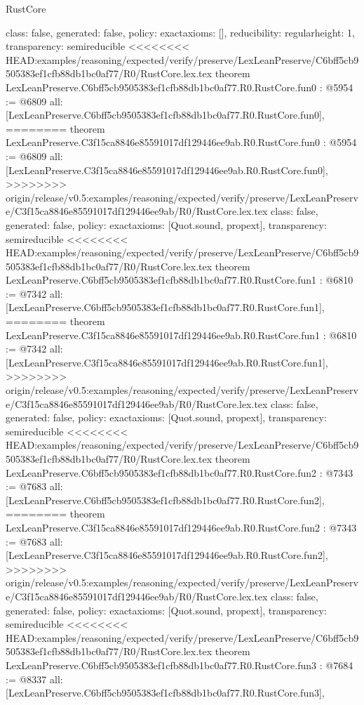 \begin{lexlean}{RustCore}
\begin{coremodule}
{\begin{coremodule}
{{{  class: false,
  generated: false,
  policy: exact{axioms: []},
  reducibility: regular{height: 1},
  transparency: semireducible
}
<<<<<<<< HEAD:examples/reasoning/expected/verify/preserve/LexLeanPreserve/C6bff5cb9505383ef1cfb88db1bc0af77/R0/RustCore.lex.tex
theorem LexLeanPreserve.C6bff5cb9505383ef1cfb88db1bc0af77.R0.RustCore.fun0 : @5954 := @6809 {
  all: [LexLeanPreserve.C6bff5cb9505383ef1cfb88db1bc0af77.R0.RustCore.fun0],
========
theorem LexLeanPreserve.C3f15ca8846e85591017df129446ee9ab.R0.RustCore.fun0 : @5954 := @6809 {
  all: [LexLeanPreserve.C3f15ca8846e85591017df129446ee9ab.R0.RustCore.fun0],
>>>>>>>> origin/release/v0.5:examples/reasoning/expected/verify/preserve/LexLeanPreserve/C3f15ca8846e85591017df129446ee9ab/R0/RustCore.lex.tex
  class: false,
  generated: false,
  policy: exact{axioms: [Quot.sound, propext]},
  transparency: semireducible
}
<<<<<<<< HEAD:examples/reasoning/expected/verify/preserve/LexLeanPreserve/C6bff5cb9505383ef1cfb88db1bc0af77/R0/RustCore.lex.tex
theorem LexLeanPreserve.C6bff5cb9505383ef1cfb88db1bc0af77.R0.RustCore.fun1 : @6810 := @7342 {
  all: [LexLeanPreserve.C6bff5cb9505383ef1cfb88db1bc0af77.R0.RustCore.fun1],
========
theorem LexLeanPreserve.C3f15ca8846e85591017df129446ee9ab.R0.RustCore.fun1 : @6810 := @7342 {
  all: [LexLeanPreserve.C3f15ca8846e85591017df129446ee9ab.R0.RustCore.fun1],
>>>>>>>> origin/release/v0.5:examples/reasoning/expected/verify/preserve/LexLeanPreserve/C3f15ca8846e85591017df129446ee9ab/R0/RustCore.lex.tex
  class: false,
  generated: false,
  policy: exact{axioms: [Quot.sound, propext]},
  transparency: semireducible
}
<<<<<<<< HEAD:examples/reasoning/expected/verify/preserve/LexLeanPreserve/C6bff5cb9505383ef1cfb88db1bc0af77/R0/RustCore.lex.tex
theorem LexLeanPreserve.C6bff5cb9505383ef1cfb88db1bc0af77.R0.RustCore.fun2 : @7343 := @7683 {
  all: [LexLeanPreserve.C6bff5cb9505383ef1cfb88db1bc0af77.R0.RustCore.fun2],
========
theorem LexLeanPreserve.C3f15ca8846e85591017df129446ee9ab.R0.RustCore.fun2 : @7343 := @7683 {
  all: [LexLeanPreserve.C3f15ca8846e85591017df129446ee9ab.R0.RustCore.fun2],
>>>>>>>> origin/release/v0.5:examples/reasoning/expected/verify/preserve/LexLeanPreserve/C3f15ca8846e85591017df129446ee9ab/R0/RustCore.lex.tex
  class: false,
  generated: false,
  policy: exact{axioms: [Quot.sound, propext]},
  transparency: semireducible
}
<<<<<<<< HEAD:examples/reasoning/expected/verify/preserve/LexLeanPreserve/C6bff5cb9505383ef1cfb88db1bc0af77/R0/RustCore.lex.tex
theorem LexLeanPreserve.C6bff5cb9505383ef1cfb88db1bc0af77.R0.RustCore.fun3 : @7684 := @8337 {
  all: [LexLeanPreserve.C6bff5cb9505383ef1cfb88db1bc0af77.R0.RustCore.fun3],
}}}}}}
\end{coremodule}}
\end{coremodule}
\end{lexlean}
